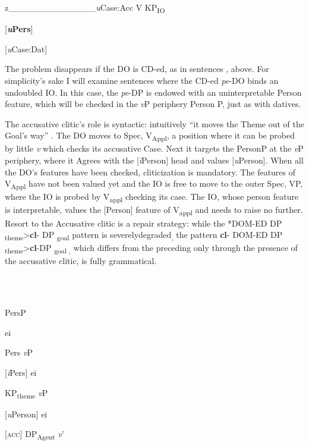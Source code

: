 \documentclass[output=paper,colorlinks,citecolor=brown]{./langscibook}
\begin{document}
  z\_\_\_\_\_\_\_\_\_\_\_\_\_\_\textit{u}Case:Acc  V    KP\textsubscript{IO}

              [\textbf{\textit{u}}\textbf{Pers}]

              [\textit{u}Case:Dat]

The problem disappears if the DO is CD-ed, as in sentences ,  above. For simplicity’s sake I will examine sentences where the CD-ed \textit{pe}{}-DO binds an undoubled IO. In this case, the \textit{pe}{}-DP is endowed with an uninterpretable Person feature, which will be checked in the \textit{v}P periphery Person P, just as with datives.

The accusative clitic’s role is syntactic: intuitively “it moves the Theme out of the Goal’s way” \citep{Anagnostopoulou2006}. The DO moves to Spec, V\textsubscript{Appl}, a position where it can be probed by little \textit{v} which checks its accusative Case. Next it targets the PersonP at the \textit{v}P periphery, where it Agrees with the [\textit{i}Person] head and values [\textit{u}Person]. When all the DO’s features have been checked, cliticization is mandatory. The features of V\textsubscript{Appl} have not been valued yet and the IO is free to move to the outer Spec, VP, where the IO is probed by V\textsubscript{appl} checking its case. The IO, whose person feature is interpretable, values the [Person] feature of V\textsubscript{appl} and needs to raise no further. Resort to the Accusative clitic is a repair strategy: while the *DOM-ED DP \textsubscript{theme}>\textbf{cl}{}- DP \textsubscript{goal} pattern is severelydegraded\textsubscript{,} the pattern \textbf{cl}{}- DOM-ED DP \textsubscript{theme}>\textbf{cl}{}-DP \textsubscript{goal ,} which differs from the preceding only through the presence of the accusative clitic, is fully grammatical.

\ea%
    \label{ex:key:41}
    \gll\\
        \\
    \glt
    \z

          

PersP

     ei

Pers    \textit{v}P

[\textit{i}Pers]        ei

  KP\textsubscript{theme}      \textit{v}P

  [\textit{u}Person]   ei

     [\textsc{acc}]  DP\textsubscript{Agent}    \textit{v}’
\end{document}
